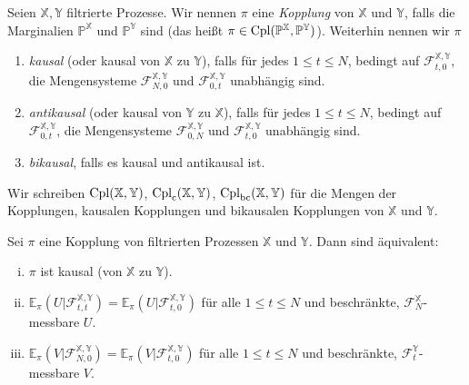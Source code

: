 \begin{definition}
Seien $\mathbb{X}, \mathbb{Y}$ filtrierte Prozesse. Wir nennen $\pi$ eine \emph{Kopplung} von $\mathbb{X}$ und $\mathbb{Y}$, falls die Marginalien $\mathbb{P}^\mathbb{X}$ und $\mathbb{P}^\mathbb{Y}$ sind (das heißt $\pi \in \operatorname{Cpl}(\mathbb{P}^\mathbb{X}, \mathbb{P}^\mathbb{Y})$). Weiterhin nennen wir $\pi$
\begin{enumerate}
\item \emph{kausal} (oder kausal von $\mathbb{X}$ zu $\mathbb{Y}$), falls für jedes $1\leq t\leq N$, bedingt auf $\mathcal{F}_{t, 0}^{\mathbb{X}, \mathbb{Y}}$, die Mengensysteme $\mathcal{F}_{N, 0}^{\mathbb{X}, \mathbb{Y}}$ und $\mathcal{F}_{0, t}^{\mathbb{X},\mathbb{Y}}$ unabhängig sind.
\item \emph{antikausal} (oder kausal von $\mathbb{Y}$ zu $\mathbb{X}$), falls für jedes $1 \leq t \leq N$, bedingt auf $\mathcal{F}_{0, t}^{\mathbb{X}, \mathbb{Y}}$, die Mengensysteme $\mathcal{F}_{0, N}^{\mathbb{X}, \mathbb{Y}}$ und $\mathcal{F}_{t, 0}^{\mathbb{X}, \mathbb{Y}}$ unabhängig sind.
\item \emph{bikausal}, falls es kausal und antikausal ist.
\end{enumerate}
Wir schreiben $\operatorname{Cpl}(\mathbb{X}, \mathbb{Y})$, $\operatorname{Cpl}_{\operatorname{c}}(\mathbb{X}, \mathbb{Y})$, $\operatorname{Cpl}_{\operatorname{bc}}(\mathbb{X}, \mathbb{Y})$ für die Mengen der Kopplungen, kausalen Kopplungen und bikausalen Kopplungen von $\mathbb{X}$ und $\mathbb{Y}$.
\end{definition}
\begin{lemma}\label{thm:causality_characterization}
Sei $\pi$ eine Kopplung von filtrierten Prozessen $\mathbb{X}$ und $\mathbb{Y}$. Dann sind äquivalent:
\begin{enumerate}[(i)]
\item $\pi$ ist kausal (von $\mathbb{X}$ zu $\mathbb{Y}$).
\item $\mathbb{E}_\pi(U \vert \mathcal{F}_{t, t}^{\mathbb{X}, \mathbb{Y}}) = \mathbb{E}_\pi(U \vert \mathcal{F}_{t, 0}^{\mathbb{X}, \mathbb{Y}})$ für alle $1\leq t\leq N$ und beschränkte, $\mathcal{F}_N^\mathbb{X}$-messbare $U$.
\item $\mathbb{E}_\pi(V\vert \mathcal{F}_{N, 0}^{\mathbb{X}, \mathbb{Y}}) = \mathbb{E}_\pi(V \vert \mathcal{F}_{t, 0}^{\mathbb{X}, \mathbb{Y}})$ für alle $1\leq t\leq N$ und beschränkte, $\mathcal{F}_t^\mathbb{Y}$-messbare $V$.
\end{enumerate}
\end{lemma}
